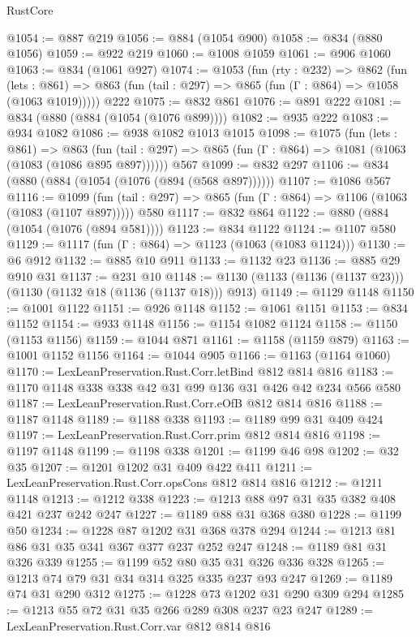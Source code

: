 \begin{lexlean}{RustCore}
\begin{coremodule}
@1054 := @887 @219
@1056 := @884 (@1054 @900)
@1058 := @834 (@880 @1056)
@1059 := @922 @219
@1060 := @1008 @1059
@1061 := @906 @1060
@1063 := @834 (@1061 @927)
@1074 := @1053
    (fun (rty : @232) =>
    @862
      (fun (lets : @861) =>
      @863 (fun (tail : @297) => @865 (fun (Γ : @864) => @1058 (@1063 @1019)))))
    @222
@1075 := @832 @861
@1076 := @891 @222
@1081 := @834 (@880 (@884 (@1054 (@1076 @899))))
@1082 := @935 @222
@1083 := @934 @1082
@1086 := @938 @1082 @1013 @1015
@1098 := @1075
    (fun (lets : @861) =>
    @863 (fun (tail : @297) => @865 (fun (Γ : @864) => @1081 (@1063 (@1083 (@1086 @895 @897))))))
    @567
@1099 := @832 @297
@1106 := @834 (@880 (@884 (@1054 (@1076 (@894 (@568 @897))))))
@1107 := @1086 @567
@1116 := @1099
    (fun (tail : @297) => @865 (fun (Γ : @864) => @1106 (@1063 (@1083 (@1107 @897)))))
    @580
@1117 := @832 @864
@1122 := @880 (@884 (@1054 (@1076 (@894 @581))))
@1123 := @834 @1122
@1124 := @1107 @580
@1129 := @1117 (fun (Γ : @864) => @1123 (@1063 (@1083 @1124)))
@1130 := @6 @912
@1132 := @885 @10 @911
@1133 := @1132 @23
@1136 := @885 @29 @910 @31
@1137 := @231 @10
@1148 := @1130 (@1133 (@1136 (@1137 @23))) (@1130 (@1132 @18 (@1136 (@1137 @18))) @913)
@1149 := @1129 @1148
@1150 := @1001 @1122
@1151 := @926 @1148
@1152 := @1061 @1151
@1153 := @834 @1152
@1154 := @933 @1148
@1156 := @1154 @1082 @1124
@1158 := @1150 (@1153 @1156)
@1159 := @1044 @871
@1161 := @1158 (@1159 @879)
@1163 := @1001 @1152 @1156
@1164 := @1044 @905
@1166 := @1163 (@1164 @1060)
@1170 := LexLeanPreservation.Rust.Corr.letBind @812 @814 @816
@1183 := @1170 @1148 @338 @338 @42 @31 @99 @136 @31 @426 @42 @234 @566 @580
@1187 := LexLeanPreservation.Rust.Corr.eOfB @812 @814 @816
@1188 := @1187 @1148
@1189 := @1188 @338
@1193 := @1189 @99 @31 @409 @424
@1197 := LexLeanPreservation.Rust.Corr.prim @812 @814 @816
@1198 := @1197 @1148
@1199 := @1198 @338
@1201 := @1199 @46 @98
@1202 := @32 @35
@1207 := @1201 @1202 @31 @409 @422 @411
@1211 := LexLeanPreservation.Rust.Corr.opsCons @812 @814 @816
@1212 := @1211 @1148
@1213 := @1212 @338
@1223 := @1213 @88 @97 @31 @35 @382 @408 @421 @237 @242 @247
@1227 := @1189 @88 @31 @368 @380
@1228 := @1199 @50
@1234 := @1228 @87 @1202 @31 @368 @378 @294
@1244 := @1213 @81 @86 @31 @35 @341 @367 @377 @237 @252 @247
@1248 := @1189 @81 @31 @326 @339
@1255 := @1199 @52 @80 @35 @31 @326 @336 @328
@1265 := @1213 @74 @79 @31 @34 @314 @325 @335 @237 @93 @247
@1269 := @1189 @74 @31 @290 @312
@1275 := @1228 @73 @1202 @31 @290 @309 @294
@1285 := @1213 @55 @72 @31 @35 @266 @289 @308 @237 @23 @247
@1289 := LexLeanPreservation.Rust.Corr.var @812 @814 @816

\end{coremodule}
\end{lexlean}
